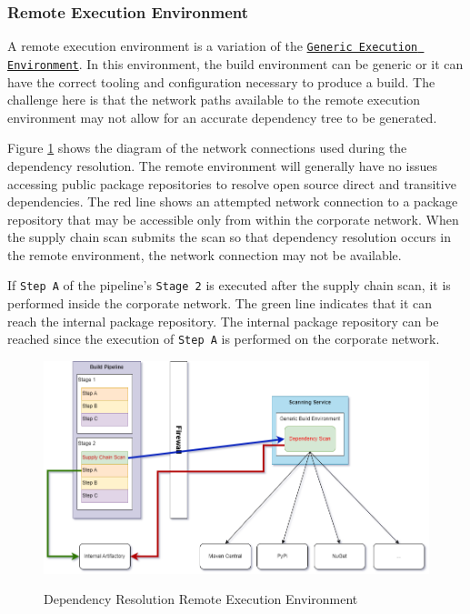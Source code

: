 \subsubsection{Remote Execution Environment}\label{sssec:remote_environment}

A remote execution environment is a variation of the 
\hyperref[sssec:generic_environment]{\texttt{Generic Execution Environment}}.  In this
environment, the build environment can be generic or it can have the correct tooling
and configuration necessary to produce a build.  The challenge here is that the network
paths available to the remote execution environment may not allow for an accurate
dependency tree to be generated.

Figure \ref{fig:dependency_resolution} shows the diagram of the network connections
used during the dependency resolution.  The remote environment will generally have
no issues accessing public package repositories to resolve open source direct and transitive
dependencies.  The red line shows an attempted network connection to a package
repository that may be accessible only from within the corporate network.  When the
supply chain scan submits the scan so that dependency resolution occurs in the
remote environment, the network connection may not be available.  

If \texttt{Step A} of the pipeline's \texttt{Stage 2} is executed after the supply chain
scan, it is performed inside the corporate network.  The green line indicates that it can 
reach the internal package repository.  The internal package repository can be reached
since the execution of \texttt{Step A} is performed on the corporate network.

\begin{figure}[h]
    \caption{Dependency Resolution Remote Execution Environment}
    \includegraphics[width=\textwidth]{graphics/dependency_resolution.png}
    \label{fig:dependency_resolution}
\end{figure}


